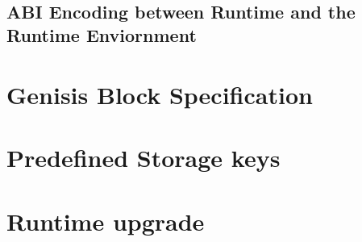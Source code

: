 \documentclass{article}
\begin{document}
\ \ \

\subsection{ABI Encoding between Runtime and the Runtime Enviornment}

\section{Genisis Block Specification}\label{sect-genisis-block}

\section{Predefined Storage keys}\label{sect-predef-storage-keys}

\section{Runtime upgrade}\label{sect-runtime-upgrade}
\end{document}
